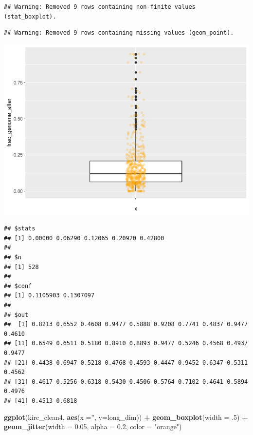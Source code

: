 \documentclass[]{article}
\newenvironment{Shaded}{\begin{snugshade}}{\end{snugshade}}
\newcommand{\KeywordTok}[1]{\textcolor[rgb]{0.13,0.29,0.53}{\textbf{#1}}}
\newcommand{\DataTypeTok}[1]{\textcolor[rgb]{0.13,0.29,0.53}{#1}}
\newcommand{\DecValTok}[1]{\textcolor[rgb]{0.00,0.00,0.81}{#1}}
\newcommand{\FloatTok}[1]{\textcolor[rgb]{0.00,0.00,0.81}{#1}}
\newcommand{\StringTok}[1]{\textcolor[rgb]{0.31,0.60,0.02}{#1}}
\newcommand{\OperatorTok}[1]{\textcolor[rgb]{0.81,0.36,0.00}{\textbf{#1}}}
\newcommand{\NormalTok}[1]{#1}
\begin{document}
\begin{verbatim}
## Warning: Removed 9 rows containing non-finite values (stat_boxplot).
\end{verbatim}

\begin{verbatim}
## Warning: Removed 9 rows containing missing values (geom_point).
\end{verbatim}

\includegraphics{figs/render-unnamed-chunk-21-1.pdf}

\begin{Shaded}
\end{Shaded}

\begin{verbatim}
## $stats
## [1] 0.00000 0.06290 0.12065 0.20920 0.42800
## 
## $n
## [1] 528
## 
## $conf
## [1] 0.1105903 0.1307097
## 
## $out
##  [1] 0.8213 0.6552 0.4608 0.9477 0.5888 0.9208 0.7741 0.4837 0.9477 0.4610
## [11] 0.6549 0.6511 0.5180 0.8910 0.8893 0.9477 0.5246 0.4568 0.4937 0.9477
## [21] 0.4438 0.6947 0.5218 0.4768 0.4593 0.4447 0.9452 0.6347 0.5311 0.4562
## [31] 0.4617 0.5256 0.6318 0.5430 0.4506 0.5764 0.7102 0.4641 0.5894 0.4976
## [41] 0.4513 0.6818
\end{verbatim}

\begin{Shaded}
\begin{Highlighting}[]
\KeywordTok{ggplot}\NormalTok{(kirc_clean4, }\KeywordTok{aes}\NormalTok{(}\DataTypeTok{x =}\StringTok{''}\NormalTok{, }\DataTypeTok{y=}\NormalTok{long_dim)) }\OperatorTok{+}
\StringTok{     }\KeywordTok{geom_boxplot}\NormalTok{(}\DataTypeTok{width =}\NormalTok{ .}\DecValTok{5}\NormalTok{) }\OperatorTok{+}
\StringTok{     }\KeywordTok{geom_jitter}\NormalTok{(}\DataTypeTok{width =} \FloatTok{0.05}\NormalTok{, }\DataTypeTok{alpha =} \FloatTok{0.2}\NormalTok{, }\DataTypeTok{color =} \StringTok{"orange"}\NormalTok{)}
\end{Highlighting}
\end{Shaded}
\end{document}
